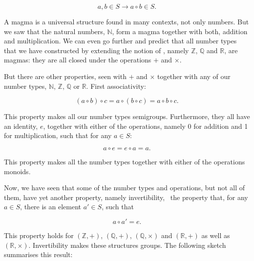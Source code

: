 \documentclass[tikz]{scrreprt}
\begin{document}
\[
a,b \in S \rightarrow a\circ b \in S.
\]

A magma is a universal structure found
in many contexts, not only numbers. But
we saw that the natural numbers, $\mathbb{N}$, 
form a magma together with both, addition
and multiplication. We can even go further
and predict that all number types that
we have constructed by extending the notion
of , namely
$\mathbb{Z}$,
$\mathbb{Q}$ and
$\mathbb{R}$,
are magmas: they
are all closed under the operations $+$ and
$\times$. 

But there are other properties,
seen with $+$ and $\times$ together 
with any of our number types,
$\mathbb{N}$,
$\mathbb{Z}$,
$\mathbb{Q}$ or
$\mathbb{R}$.
First associativity:

\[
(a\circ b) \circ c = a\circ (b\circ c) = a \circ b \circ c.
\]

This property makes all our number types semigroups.
Furthermore, they all have an identity, $e$, together with
either of the operations, namely 0 for addition and 1
for multiplication, such that for any $a \in S$:

\[
a \circ e = e \circ a = a.
\]

This property makes all the number types together with
either of the operations monoids.

Now, we have seen that some of the number types and operations,
but not all of them,
have yet another property, namely invertibility, \ie\
the property that, for any $a \in S$, there is an element
$a' \in S$, such that

\[
a \circ a' = e.
\]

This property holds for 
$(\mathbb{Z},+)$, 
$(\mathbb{Q},+)$, $(\mathbb{Q},\times)$ and
$(\mathbb{R},+)$ as well as
$(\mathbb{R},\times)$.
Invertibility makes these structures groups.
The following sketch summarises this result:
\end{document}
